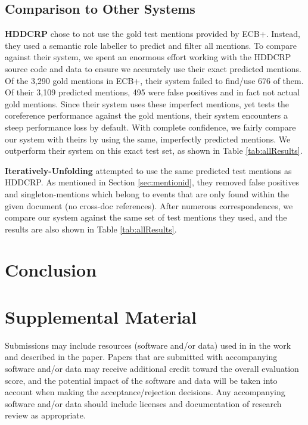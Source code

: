 \documentclass[11pt,a4paper]{article}
\begin{document}
\subsection{Comparison to Other Systems}
\textbf{HDDCRP} chose to not use the gold test mentions provided by ECB+.  Instead, they used a semantic role labeller to predict and filter all mentions.
To compare against their system, we spent an enormous effort working with the HDDCRP source code and data to ensure we accurately use their exact predicted mentions.  Of the 3,290 gold mentions in ECB+, their system failed to find/use 676 of them.  Of their 3,109 predicted mentions, 495 were false positives and in fact not actual gold mentions.  Since their system uses these imperfect mentions, yet tests the coreference performance against the gold mentions, their system encounters a steep performance loss by default.  With complete confidence, we fairly compare our system with theirs by using the same, imperfectly predicted mentions.  We outperform their system on this exact test set, as shown in Table \ref{tab:allResults}.

\textbf{Iteratively-Unfolding} attempted to use the same predicted test mentions as HDDCRP.  As mentioned in Section \ref{sec:mentionid}, they removed false positives and singleton-mentions which belong to events that are only found within the given document (no cross-doc references).  After numerous correspondences, we compare our system against the same set of test mentions they used, and the results are also shown in Table \ref{tab:allResults}.

\section*{Conclusion}
%
%



\appendix

\section{Supplemental Material}
\label{sec:supplemental}
Submissions may include resources (software and/or data) used in in the work and described in the paper. Papers that are submitted with accompanying software and/or data may receive additional credit toward the overall evaluation score, and the potential impact of the software and data will be taken into account when making the acceptance/rejection decisions. Any accompanying software and/or data should include licenses and documentation of research review as appropriate.
\end{document}
